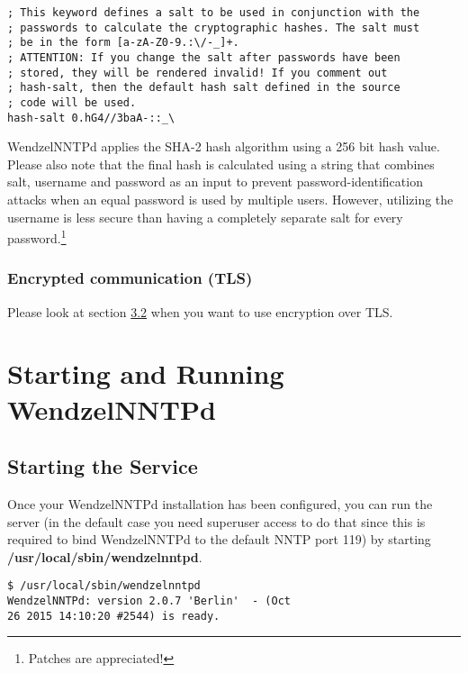 \documentclass[12pt,fleqn,leqno]{scrbook}
\begin{document}
\begin{verbatim}
; This keyword defines a salt to be used in conjunction with the
; passwords to calculate the cryptographic hashes. The salt must
; be in the form [a-zA-Z0-9.:\/-_]+.
; ATTENTION: If you change the salt after passwords have been
; stored, they will be rendered invalid! If you comment out
; hash-salt, then the default hash salt defined in the source
; code will be used.
hash-salt 0.hG4//3baA-::_\
\end{verbatim}

WendzelNNTPd applies the SHA-2 hash algorithm using a 256 bit hash
value. Please also note that the final hash is calculated using a string
that combines salt, username and password as an input to prevent
password-identification attacks when an equal password is used by
multiple users. However, utilizing the username is less secure than
having a completely separate salt for every password.\footnote{Patches
  are appreciated!}

\hypertarget{encrypted-communication-tls-1}{%
\subsubsection{Encrypted communication
(TLS)}\label{encrypted-communication-tls-1}}

Please look at section \protect\hyperlink{network-settings}{3.2} when
you want to use encryption over TLS.

\hypertarget{starting-and-running-wendzelnntpd}{%
\section{Starting and Running
WendzelNNTPd}\label{starting-and-running-wendzelnntpd}}

\hypertarget{starting-the-service}{%
\subsection{Starting the Service}\label{starting-the-service}}

Once your WendzelNNTPd installation has been configured, you can run the
server (in the default case you need superuser access to do that since
this is required to bind WendzelNNTPd to the default NNTP port 119) by
starting \textbf{/usr/local/sbin/wendzelnntpd}.

\begin{verbatim}
$ /usr/local/sbin/wendzelnntpd 
WendzelNNTPd: version 2.0.7 'Berlin'  - (Oct
26 2015 14:10:20 #2544) is ready.
\end{verbatim}
\end{document}
